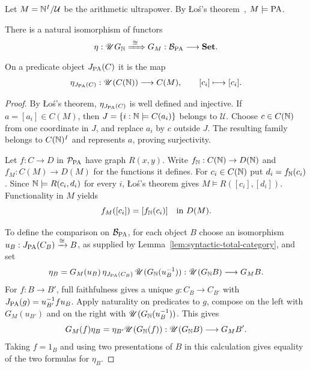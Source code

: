 Let $M=\mathbb N^I/\mathcal U$ be the arithmetic ultrapower.
By \L o\'s's theorem~\cite[Theorem~3.1]{Keisler}, $M\models\mathrm{PA}$.

\begin{lemma}
\label{lem:ultrapower-comparison}
There is a natural isomorphism of functors
\[
 \eta:\mathscr U G_{\mathbb N}\xRightarrow{\ \cong\ }G_M:
             \mathcal B_{\mathrm{PA}}\longrightarrow\mathbf{Set}.
\]
On a predicate object $J_{\mathrm{PA}}(C)$ it is the map
\begin{equation}\label{eq:ultrapower-predicate-comparison}
 \eta_{J_{\mathrm{PA}}(C)}:
 \mathscr U(C(\mathbb N))\longrightarrow C(M),
 \qquad [c_i]\longmapsto[c_i].
\end{equation}
\end{lemma}
\begin{proof}
By \L o\'s's theorem, $\eta_{J_{\mathrm{PA}}(C)}$ is well defined and
injective. If $a=[a_i]\in C(M)$, then
$J=\{i:\mathbb N\models C(a_i)\}$ belongs to $\mathcal U$.
Choose $c\in C(\mathbb N)$ from one coordinate in $J$, and replace
$a_i$ by $c$ outside $J$. The resulting family belongs to
$C(\mathbb N)^I$ and represents $a$, proving surjectivity.

Let $f:C\to D$ in $\mathcal P_{\mathrm{PA}}$ have graph $R(x,y)$. Write
$f_{\mathbb N}:C(\mathbb N)\to D(\mathbb N)$ and $f_M:C(M)\to D(M)$ for the functions
it defines. For $c_i\in C(\mathbb N)$ put $d_i=f_{\mathbb N}(c_i)$. Since
$\mathbb N\models R(c_i,d_i)$ for every $i$, \L o\'s's theorem gives
$M\models R([c_i],[d_i])$. Functionality in $M$ yields
\[
 f_M([c_i])=[f_{\mathbb N}(c_i)]\quad\text{in }D(M).
\]

To define the comparison on $\mathcal B_{\mathrm{PA}}$, for each
object $B$ choose an isomorphism
$u_B:J_{\mathrm{PA}}(C_B)\xrightarrow{\cong}B$, as supplied by
Lemma~\ref{lem:syntactic-total-category}, and set
\[
 \eta_B=G_M(u_B)\,
       \eta_{J_{\mathrm{PA}}(C_B)}\,
       \mathscr U(G_{\mathbb N}(u_B^{-1})):
       \mathscr U(G_{\mathbb N}B)\longrightarrow G_MB.
\]
For $f:B\to B'$, full faithfulness gives a unique
$g:C_B\to C_{B'}$ with $J_{\mathrm{PA}}(g)=u_{B'}^{-1}fu_B$.
Apply naturality on predicates to $g$, compose on the left with
$G_M(u_{B'})$ and on the right with $\mathscr U(G_{\mathbb N}(u_B^{-1}))$.
This gives
\[
 G_M(f)\eta_B=\eta_{B'}\mathscr U(G_{\mathbb N}(f)):
       \mathscr U(G_{\mathbb N}B)\longrightarrow G_MB'.
\]
Taking $f=1_B$ and using two presentations of $B$ in this calculation
gives equality of the two formulas for $\eta_B$.
\end{proof}

